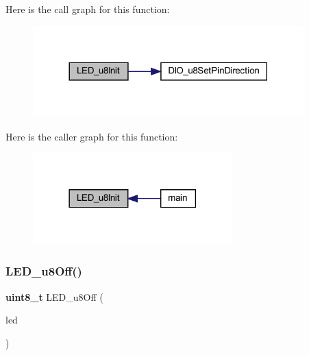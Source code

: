 Here is the call graph for this function\+:
\nopagebreak
\begin{figure}[H]
\begin{center}
\leavevmode
\includegraphics[width=296pt]{_l_e_d_8h_a5ffbd3f57e696c662ae3ae52b119e867_cgraph}
\end{center}
\end{figure}
Here is the caller graph for this function\+:
\nopagebreak
\begin{figure}[H]
\begin{center}
\leavevmode
\includegraphics[width=218pt]{_l_e_d_8h_a5ffbd3f57e696c662ae3ae52b119e867_icgraph}
\end{center}
\end{figure}
\mbox{\label{_l_e_d_8h_a9d5b876815db0f9fa1d1e2b3ecb4de64}} 
\subsubsection{L\+E\+D\+\_\+u8\+Off()}
{\footnotesize\ttfamily \textbf{ uint8\+\_\+t} L\+E\+D\+\_\+u8\+Off (\begin{DoxyParamCaption}\item[{\textbf{ L\+E\+D\+\_\+t}}]{led }\end{DoxyParamCaption})}

